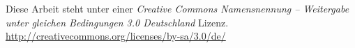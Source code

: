 \noindent\cclicense{}
Diese Arbeit steht unter einer 
{\em Creative Commons Namensnennung -- Weitergabe unter gleichen Bedingungen 3.0 Deutschland}
Lizenz. \\
\url{http://creativecommons.org/licenses/by-sa/3.0/de/}
